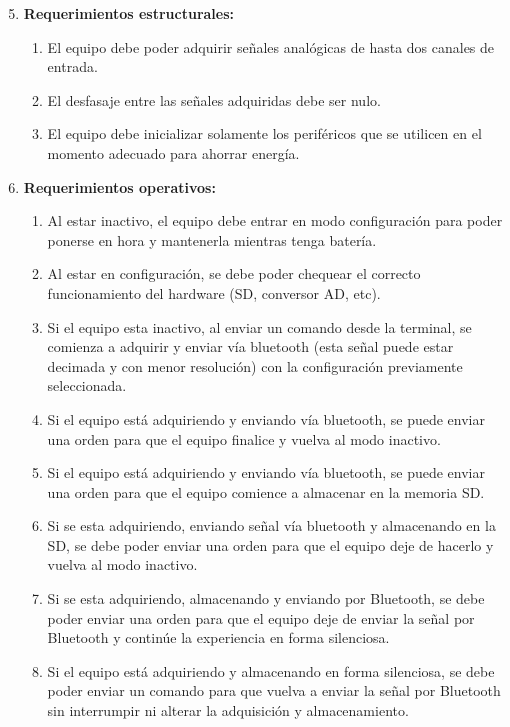 \begin{enumerate}

	\setcounter{enumi}{4}

	\item \textbf{Requerimientos estructurales:} 
	\begin{enumerate}[label*=\arabic*.]
		\item El equipo debe poder adquirir señales analógicas de hasta dos canales de entrada.
		\item El desfasaje entre las señales adquiridas debe ser nulo.
		\item El equipo debe inicializar solamente los periféricos que se utilicen en el momento adecuado para ahorrar energía. 
	\end{enumerate}
	
	\item \textbf{Requerimientos operativos:}
	\begin{enumerate}[label*=\arabic*.]
		\item Al estar inactivo, el equipo debe entrar en modo configuración para poder ponerse en hora y mantenerla mientras tenga batería.
		\item Al estar en configuración, se debe poder chequear el correcto funcionamiento del hardware (SD, conversor AD, etc).
		\item Si el equipo esta inactivo, al enviar un comando desde la terminal, se comienza a adquirir y enviar vía bluetooth (esta señal puede estar decimada y con menor resolución) con la configuración previamente seleccionada.
		\item Si el equipo está adquiriendo y enviando vía bluetooth, se puede enviar una orden para que el equipo finalice y vuelva al modo inactivo.
		\item Si el equipo está adquiriendo y enviando vía bluetooth, se puede enviar una orden para que el equipo comience a almacenar en la memoria SD.
		\item Si se esta adquiriendo, enviando señal vía bluetooth y almacenando en la SD, se debe poder enviar una orden para que el equipo deje de hacerlo y vuelva al modo inactivo.
		\item Si se esta adquiriendo, almacenando y enviando por Bluetooth, se debe poder enviar una orden para que el equipo deje de enviar la señal por Bluetooth y continúe la experiencia en forma silenciosa.
		\item Si el equipo está adquiriendo y almacenando en forma silenciosa, se debe poder enviar un comando para que vuelva a enviar la señal por Bluetooth sin interrumpir ni alterar la adquisición y almacenamiento.

\end{enumerate}
\end{enumerate}
